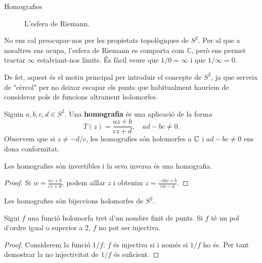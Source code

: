 \documentclass[dvipsnames, svgnames, leqno, a4paper, 12pt]{report}
\begin{document}
\begin{chapter}{Homografies}
\begin{figure}[H]
            \caption{L'esfera de Riemann.}
        \end{figure}
        No ens cal preocupar-nos per les propietats topològiques de \(S^2\). Per al que a nosaltres ens ocupa, l'esfera de Riemann es comporta com \(\mathbb{C}\), però ens permet tractar \(\infty\) estalviant-nos límits. És fàcil veure que \(1/0 = \infty\) i que \(1/\infty = 0\).

        De fet, aquest és el motiu principal per introduir el concepte de \(S^2\), ja que serveix de "cèrcol" per no deixar escapar els punts que habitualment hauríem de considerar pols de funcions altrament holomorfes.

        Siguin \(a,b,c,d\in S^2\). Una \textbf{homografia} és una aplicació de la forma
        \begin{displaymath}
            T(z)=\frac{az+b}{cz+d},\quad ad-bc\neq0.
        \end{displaymath}
        Observem que si $z\neq -d/c$, les homografies són holomorfes a $\mathbb{C}$ i $ad-bc\neq0$ ens dona conformitat.
        
        \begin{proposition}
            Les homografies són invertibles i la seva inversa és una homografia.
        \end{proposition}
        
        \begin{proof}
            Si \begin{math}
                 w  = \frac{az+b}{cz+d} 
            \end{math}, podem aïllar $z$ i obtenim \begin{math}
                z = \frac{-d  w +b}{c w -a}
            \end{math}.
        \end{proof}

        \begin{corollary}
            Les homografies són bijeccions holomorfes de $S^2$.
        \end{corollary}

        \begin{lemma}
            Sigui $f$  una funció holomorfa tret d'un nombre finit de punts. Si $f$ té un pol d'ordre igual o superior a 2, $f$ no pot ser injectiva.  
        \end{lemma}

        \begin{proof}
            Considerem la funció $1/f$. $f$ és injectiva si i només si $1/f$ ho és. Per tant demostrar la no injectivitat de $1/f$ és suficient.
            

\end{proof}
\end{chapter}
\end{document}
